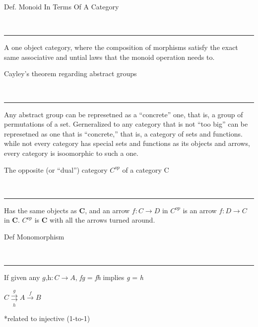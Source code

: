 \begin{note}
  \begin{field}
    Def. Monoid In Terms Of A Category
  \end{field} \\
  \noindent\rule[0.5ex]{\linewidth}{1pt}
  \begin{field}
    A one object category, where the composition of morphisms satisfy the exact same associative and untial laws that the monoid operation needs to.
  \end{field}
\end{note}

\begin{note}
  \begin{field}
   Cayley's theorem regarding abstract groups
  \end{field} \\
  \noindent\rule[0.5ex]{\linewidth}{1pt}
  \begin{field}
   Any abstract group can be represetned as a ``concrete'' one, that is, a group of permutations of a set. Gerneralized to any category that is not
   ``too big'' can be represetned as one that is ``concrete,'' that is, a category of sets and functions.\\
    while not every category has special sets and functions as its objects and arrows, every category is isoomorphic to such a one.
  \end{field}
\end{note}

\begin{note}
  \begin{field}
  The opposite (or ``dual'') category $C^{op}$ of a category C
  \end{field} \\
  \noindent\rule[0.5ex]{\linewidth}{1pt}
  \begin{field}
  Has the same objects as \textbf{C}, and an arrow $f: C \rightarrow D$ in \textbf{$C^{op}$} is an arrow $f: D \rightarrow C$ in \textbf{C}.
  \textbf{$C^{op}$} is \textbf{C} with all the arrows turned around.
  \end{field}
\end{note}

\begin{note}
  \begin{field}
  Def Monomorphism
  \end{field} \\
  \noindent\rule[0.5ex]{\linewidth}{1pt}
  \begin{field}
  If given any $\textit{g,h}: C \rightarrow A$, \textit{fg} = \textit{fh} implies \textit{g} = \textit{h} \\

  \begin{center}
  $C \overset{g}{\underset{h}{\rightrightarrows}} A \overset{f}{\rightarrow} B$
  \end{center}

  *related to injective (1-to-1)
  \end{field}
\end{note}


